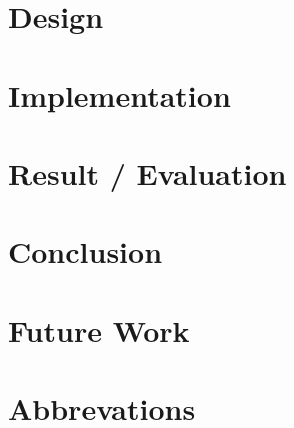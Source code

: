 \documentclass[12pt,twoside]{kau_report}
\begin{document}
\section{Design}
\label{sec:design}

\clearpage

\section{Implementation}
\label{sec:implementation}

\clearpage

\section{Result / Evaluation}
\label{sec:resultevaluation}

\clearpage

\section{Conclusion}
\label{sec:conclusion}

\clearpage

\section{Future Work}
\label{sec:futurework}

\clearpage

\section{Abbrevations}
\label{sec:abbreviations}

\clearpage

\begin{singlespace}


\end{singlespace}


\end{document}
